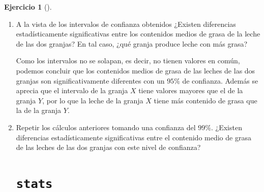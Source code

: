 \documentclass[
  a4paper,
]{scrreport}
\theoremstyle{definition}
\newtheorem{exercise}{Ejercicio}[chapter]
\theoremstyle{remark}
\begin{document}
\begin{exercise}[]
\begin{enumerate}
\begin{tcolorbox}
\begin{figure}[H]
{  }

  \end{figure}

  \end{tcolorbox}
\item
  A la vista de los intervalos de confianza obtenidos ¿Existen
  diferencias estadísticamente significativas entre los contenidos
  medios de grasa de la leche de las dos granjas? En tal caso, ¿qué
  granja produce leche con más grasa?

  \begin{tcolorbox}[enhanced jigsaw, coltitle=black, left=2mm, colback=white, leftrule=.75mm, toptitle=1mm, breakable, bottomrule=.15mm, titlerule=0mm, bottomtitle=1mm, title=\textcolor{quarto-callout-tip-color}{\faLightbulb}\hspace{0.5em}{Solución}, arc=.35mm, toprule=.15mm, rightrule=.15mm, colframe=quarto-callout-tip-color-frame, opacityback=0, colbacktitle=quarto-callout-tip-color!10!white, opacitybacktitle=0.6]

  Como los intervalos no se solapan, es decir, no tienen valores en
  común, podemos concluir que los contenidos medios de grasa de las
  leches de las dos granjas son significativamente diferentes con un
  \(95\%\) de confianza. Además se aprecia que el intervalo de la granja
  \(X\) tiene valores mayores que el de la granja \(Y\), por lo que la
  leche de la granja \(X\) tiene más contenido de grasa que la de la
  granja \(Y\).

  \end{tcolorbox}
\item
  Repetir los cálculos anteriores tomando una confianza del \(99\%\).
  ¿Existen diferencias estadísticamente significativas entre el
  contenido medio de grasa de las leches de las dos granjas con este
  nivel de confianza?

  \begin{tcolorbox}[enhanced jigsaw, coltitle=black, left=2mm, colback=white, leftrule=.75mm, toptitle=1mm, breakable, bottomrule=.15mm, titlerule=0mm, bottomtitle=1mm, title=\textcolor{quarto-callout-tip-color}{\faLightbulb}\hspace{0.5em}{Solución}, arc=.35mm, toprule=.15mm, rightrule=.15mm, colframe=quarto-callout-tip-color-frame, opacityback=0, colbacktitle=quarto-callout-tip-color!10!white, opacitybacktitle=0.6]

  \section{\texorpdfstring{\texttt{stats}}{stats}}


\end{tcolorbox}
\end{enumerate}
\end{exercise}
\end{document}
